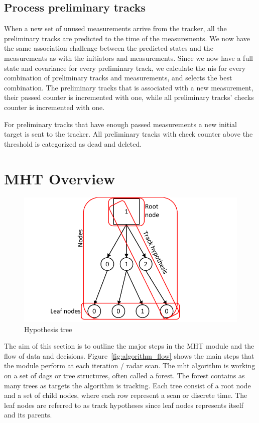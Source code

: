 \subsection{Process preliminary tracks}
When a new set of unused measurements arrive from the tracker, all the preliminary tracks are predicted to the time of the measurements. We now have the same association challenge between the predicted states and the measurements as with the initiators and measurements. Since we now have a full state and covariance for every preliminary track, we calculate the \gls{nis} for every combination of preliminary tracks and measurements, and selects the best combination. The preliminary tracks that is associated with a new measurement, their passed counter is incremented with one, while all preliminary tracks' checks counter is incremented with one. 

For preliminary tracks that have enough passed measurements a new initial target is sent to the tracker. All preliminary tracks with check counter above the threshold is categorized as dead and deleted. 

\section{MHT Overview}
\begin{figure}
 \centering
 \includegraphics{Figures/Track-tree.pdf}
 \caption{Hypothesis tree}\label{fig:hyp_tree}
\end{figure}
The aim of this section is to outline the major steps in the MHT module and the flow of data and decisions. Figure~\ref{fig:algorithm_flow} shows the main steps that the module perform at each iteration / radar scan. The \gls{mht} algorithm is working on a set of \glspl{dag} or tree structures, often called a forest. The forest contains as many trees as targets the algorithm is tracking. Each tree consist of a root node and a set of child nodes, where each row represent a scan or discrete time. The leaf nodes are referred to as track hypotheses since leaf nodes represents itself and its parents.

